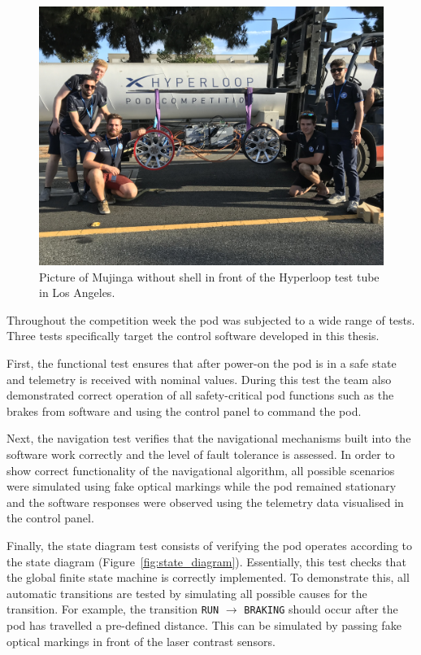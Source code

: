 \begin{figure}[H]
  \centering \includegraphics[width=1.0\textwidth]{./figures/mujinga_competition}
  \caption{Picture of Mujinga without shell in front of the Hyperloop test tube in Los Angeles.}
\end{figure}

Throughout the competition week the pod was subjected to a wide range of tests. Three tests specifically target the control software developed in this thesis.

First, the functional test ensures that after power-on the pod is in a safe state and telemetry is received with nominal values. During this test the team also demonstrated correct operation of all safety-critical pod functions such as the brakes from software and using the control panel to command the pod.

Next, the navigation test verifies that the navigational mechanisms built into the software work correctly and the level of fault tolerance is assessed. In order to show correct functionality of the navigational algorithm, all possible scenarios were simulated using fake optical markings while the pod remained stationary and the software responses were observed using the telemetry data visualised in the control panel.

Finally, the state diagram test consists of verifying the pod operates according to the state diagram (Figure~\ref{fig:state_diagram}). Essentially, this test checks that the global finite state machine is correctly implemented. To demonstrate this, all automatic transitions are tested by simulating all possible causes for the transition. For example, the transition \texttt{RUN} $\rightarrow$ \texttt{BRAKING} should occur after the pod has travelled a pre-defined distance. This can be simulated by passing fake optical markings in front of the laser contrast sensors.

